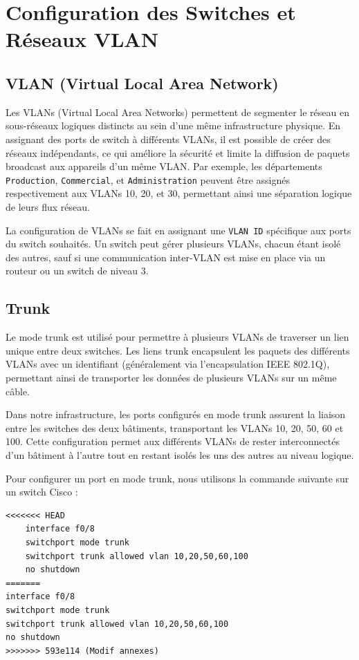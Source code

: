 \documentclass[a4paper,12pt,openany]{report}
\begin{document}
        \section{Configuration des Switches et Réseaux VLAN}

            \subsection{VLAN (Virtual Local Area Network)}
                Les VLANs (Virtual Local Area Networks) permettent de segmenter le réseau en sous-réseaux logiques distincts au sein d'une même infrastructure physique. En assignant des ports de switch à différents VLANs, il est possible de créer des réseaux indépendants, ce qui améliore la sécurité et limite la diffusion de paquets broadcast aux appareils d'un même VLAN. Par exemple, les départements \texttt{Production}, \texttt{Commercial}, et \texttt{Administration} peuvent être assignés respectivement aux VLANs 10, 20, et 30, permettant ainsi une séparation logique de leurs flux réseau.

                La configuration de VLANs se fait en assignant une \texttt{VLAN ID} spécifique aux ports du switch souhaités. Un switch peut gérer plusieurs VLANs, chacun étant isolé des autres, sauf si une communication inter-VLAN est mise en place via un routeur ou un switch de niveau 3.

            \subsection{Trunk}
                Le mode trunk est utilisé pour permettre à plusieurs VLANs de traverser un lien unique entre deux switches. Les liens trunk encapsulent les paquets des différents VLANs avec un identifiant (généralement via l'encapsulation IEEE 802.1Q), permettant ainsi de transporter les données de plusieurs VLANs sur un même câble.

                Dans notre infrastructure, les ports configurés en mode trunk assurent la liaison entre les switches des deux bâtiments, transportant les VLANs 10, 20, 50, 60 et 100. Cette configuration permet aux différents VLANs de rester interconnectés d'un bâtiment à l'autre tout en restant isolés les uns des autres au niveau logique. 

                Pour configurer un port en mode trunk, nous utilisons la commande suivante sur un switch Cisco :

                \begin{verbatim}
<<<<<<< HEAD
    interface f0/8
    switchport mode trunk
    switchport trunk allowed vlan 10,20,50,60,100
    no shutdown
=======
interface f0/8
switchport mode trunk
switchport trunk allowed vlan 10,20,50,60,100
no shutdown
>>>>>>> 593e114 (Modif annexes)
                \end{verbatim}
\end{document}
